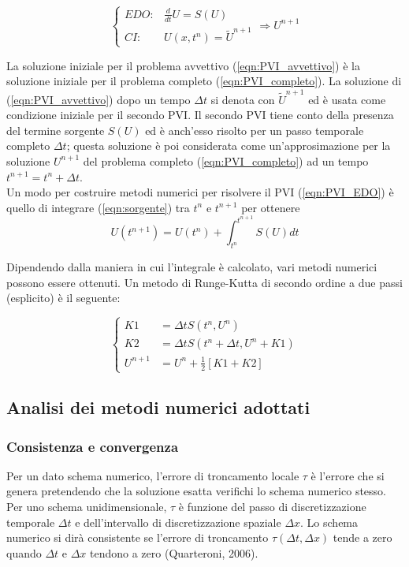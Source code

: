 \documentclass[12pt]{article} %
\begin{document}
\begin{equation}
    \left\{\begin{array}{lr}
        EDO: & \frac{d}{dt}U = S(U)\\
        CI: & U(x,t^n)=\tilde{U}^{n+1}
        \end{array}
    \right. \Longrightarrow U^{n+1}
    \label{eqn:PVI_EDO}
\end{equation}

\noindent La soluzione iniziale per il problema avvettivo (\ref{eqn:PVI_avvettivo}) è la soluzione iniziale per il problema completo (\ref{eqn:PVI_completo}). La soluzione di (\ref{eqn:PVI_avvettivo}) dopo un tempo $\Delta t$ si denota con $\tilde{U}^{n+1}$ ed è usata come condizione iniziale per il secondo PVI. Il secondo PVI tiene conto della presenza del termine sorgente $S(U)$ ed è anch'esso risolto per un passo temporale completo $\Delta t$; questa soluzione è poi considerata come un'approsimazione per la soluzione $U^{n+1}$ del problema completo (\ref{eqn:PVI_completo}) ad un tempo $t^{n+1}=t^n+\Delta t$.\\
Un modo per costruire metodi numerici per risolvere il PVI (\ref{eqn:PVI_EDO}) è quello di integrare (\ref{eqn:sorgente}) tra $t^n$ e $t^{n+1}$ per ottenere
\begin{equation}
    U(t^{n+1}) = U(t^n) + \int_{t^n}^{t^{n+1}}S(U)dt
\end{equation}

\noindent Dipendendo dalla maniera in cui l'integrale è calcolato, vari metodi numerici possono essere ottenuti. Un metodo di Runge-Kutta di secondo ordine a due passi (esplicito) è il seguente:

\begin{equation}
    \left\{\begin{array}{ll}
        K1 &= \Delta tS(t^n,U^n)\\
        K2 &= \Delta tS(t^n+\Delta t, U^n+K1)\\
        U^{n+1} &= U^n + \frac{1}{2}[K1+K2]
         \end{array}
    \right.
    \label{eqn:Runge-Kutta}
\end{equation}

\subsection{Analisi dei metodi numerici adottati}
\subsubsection{Consistenza e convergenza}
\noindent Per un dato schema numerico, l'errore di troncamento locale $\tau$ è l'errore che si genera pretendendo che la soluzione esatta verifichi lo schema numerico stesso.
Per uno schema unidimensionale, $\tau$ è  funzione del passo di discretizzazione temporale $\Delta t$ e  dell'intervallo di discretizzazione spaziale $\Delta x$. Lo schema numerico si dirà consistente se l'errore di troncamento $\tau(\Delta t, \Delta x)$ tende a zero quando $\Delta t$ e $\Delta x$ tendono a zero (Quarteroni, 2006).
\end{document}
